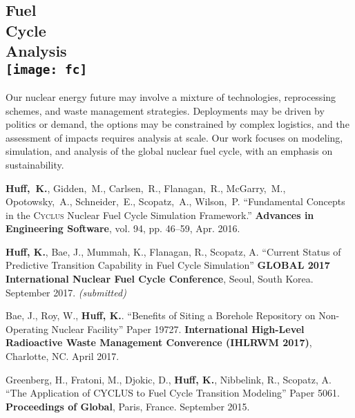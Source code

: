 \documentclass[margin,line]{resume}
\newcommand{\Cyclus}{\textsc{Cyclus}\xspace}%
\begin{document}
\begin{resume}
    \section{\mysidestyle Fuel\\Cycle\\Analysis\\ \vspace{12mm}
        \texttt{[image: fc]}}
Our nuclear energy future may involve a mixture of technologies, reprocessing 
        schemes, and waste management strategies. Deployments may be driven by 
        politics or demand, the options may be constrained by complex 
        logistics, and the assessment of impacts requires analysis at scale. 
        Our work focuses on modeling, simulation, and analysis of the global 
        nuclear fuel cycle, with an emphasis on sustainability.
        \vspace{2mm}

      \begin{bibenum}
       \item \textbf{Huff,~K.}, Gidden,~M., Carlsen,~R., Flanagan,~R.,
       McGarry,~M., Opotowsky,~A., Schneider,~E.,
       Scopatz,~A., Wilson,~P.  ``Fundamental Concepts in the \Cyclus Nuclear Fuel Cycle
       Simulation Framework.'' \textbf{Advances in Engineering Software}, vol. 94, pp. 46–59, Apr. 2016.
      \item \textbf{Huff, K.}, Bae, J., Mummah, K., Flanagan, R., Scopatz, A.
            ``Current Status of Predictive Transition Capability in Fuel Cycle 
            Simulation'' \textbf{GLOBAL 2017 International Nuclear Fuel Cycle 
            Conference}, Seoul, South Korea. September 2017. \emph{(submitted)}
      \item Bae, J., Roy, W., \textbf{Huff, K.}.
            ``Benefits of Siting a Borehole Repository on Non-Operating Nuclear 
            Facility'' Paper 19727.  \textbf{International High-Level Radioactive 
            Waste Management Converence (IHLRWM 2017)},
            Charlotte, NC. April 2017. 
      \item Greenberg, H., Fratoni, M., Djokic, D., \textbf{Huff, K.},
         Nibbelink, R., Scopatz, A. ``The Application of CYCLUS to Fuel Cycle
         Transition Modeling'' Paper 5061.
         \textbf{Proceedings of Global}, Paris, France. September 2015.
      \end{bibenum}


      \vspace{2mm}

\end{resume}
\end{document}
